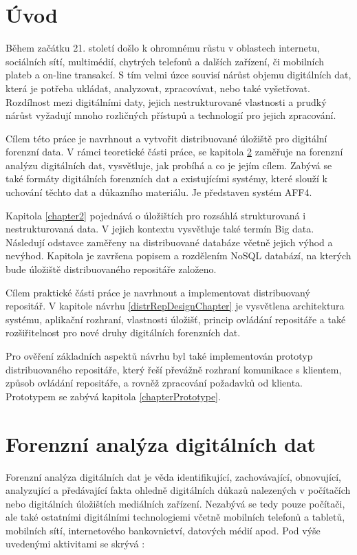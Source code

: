 

\chapter{Úvod}
Během začátku 21. století došlo k ohromnému růstu v oblastech internetu, sociálních sítí, multimédií, chytrých telefonů a dalších zařízení, či mobilních plateb a on-line transakcí. S tím velmi úzce souvisí nárůst objemu digitálních dat, která je potřeba ukládat, analyzovat, zpracovávat, nebo také vyšetřovat. Rozdílnost mezi digitálními daty, jejich nestrukturované vlastnosti a prudký nárůst vyžadují mnoho rozličných přístupů a technologií pro jejich zpracování.

Cílem této práce je navrhnout a vytvořit distribuované úložiště pro digitální forenzní data. V rámci teoretické části práce, se kapitola \ref{chapter1} zaměřuje na forenzní analýzu digitálních dat, vysvětluje, jak probíhá a co je jejím cílem. Zabývá se také formáty digitálních forenzních dat a existujícími systémy, které slouží k uchování těchto dat a důkazního materiálu. Je představen systém AFF4.

Kapitola \ref{chapter2} pojednává o úložištích pro rozsáhlá strukturovaná i nestrukturovaná data. V jejich kontextu vysvětluje také termín Big data. Následují odstavce zaměřeny na distribuované databáze včetně jejich výhod a nevýhod. Kapitola je završena popisem a rozdělením NoSQL databází, na kterých bude úložiště distribuovaného repositáře založeno.

Cílem praktické části práce je navrhnout a implementovat distribuovaný repositář. V kapitole návrhu \ref{distrRepDesignChapter} je vysvětlena architektura systému, aplikační rozhraní, vlastnosti úložišť, princip ovládání repositáře a také rozšiřitelnost pro nové druhy digitálních forenzních dat.

Pro ověření základních aspektů návrhu byl také implementován prototyp distribuovaného repositáře, který řeší převážně rozhraní komunikace s klientem, způsob ovládání repositáře, a rovněž zpracování požadavků od klienta. Prototypem se zabývá kapitola \ref{chapterPrototype}.

\chapter{Forenzní analýza digitálních dat} \label{chapter1}
Forenzní analýza digitálních dat je věda identifikující, zachovávající, obnovující, analyzující a předávající fakta ohledně digitálních důkazů nalezených v počítačích nebo digitálních úložištích mediálních zařízení.
Nezabývá se tedy pouze počítači, ale také ostatními digitálními technologiemi včetně mobilních telefonů a tabletů, mobilních sítí, internetového bankovnictví, datových médií apod. Pod výše uvedenými aktivitami se skrývá \cite{whatIsDigFor}:

